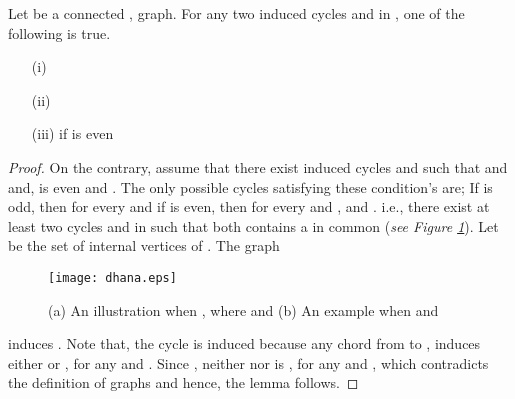 \documentclass[runningheads]{llncs}
\begin{document}
\begin{lemma}
\label{intersection}
Let  be a connected , graph. For any two induced cycles  and  in , one of the following is true.
\begin{itemize}
\item[(i)] 
\item[(ii)] 
\item[(iii)]  if  is even
\end{itemize}
\end{lemma}
\begin{proof}
On the contrary, assume that there exist induced cycles  and  such that  and  and,  is even and . The only possible cycles satisfying these condition's are; If  is odd, then for every  and if  is even, then for every  and ,   and .  i.e., there exist at least two cycles  and  in  such that both contains a  in common (\emph{see Figure  \ref{sisj}}). Let  be the set of internal vertices of . The graph 
\begin{figure}[h]
\centering
\texttt{[image: dhana.eps]}
\caption{(a) An illustration when , where  and  (b) An example when  and }
\label{sisj}
\end{figure}
\noindent  induces . Note that, the cycle is induced because any chord from  to ,  induces either  or , for any  and . Since , neither  nor  is ,  for any  and , which contradicts the definition of  graphs and hence, the lemma follows.
\end{proof}
                                                                                                                                                                               
\end{document}
